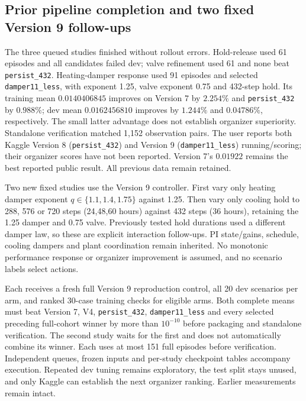 


\subsection{Prior pipeline completion and two fixed Version 9 follow-ups}
The three queued studies finished without rollout errors. Hold-release used
61 episodes and all candidates failed dev; valve refinement used 61 and none
beat \texttt{persist\_432}. Heating-damper response used 91 episodes and
selected \texttt{damper11\_less}, with exponent 1.25, valve exponent 0.75 and
432-step hold. Its training mean $0.0140406845$ improves on Version 7 by
$2.254\%$ and \texttt{persist\_432} by $0.988\%$; dev mean $0.0162456810$
improves by $1.244\%$ and $0.04786\%$, respectively. The small latter
advantage does not establish organizer superiority. Standalone verification
matched 1,152 observation pairs. The user reports both Kaggle Version 8
(\texttt{persist\_432}) and Version 9 (\texttt{damper11\_less}) running/scoring;
their organizer scores have not been reported. Version 7's $0.01922$ remains
the best reported public result. All previous data remain retained.

Two new fixed studies use the Version 9 controller. First vary only heating
damper exponent $q\in\{1.1,1.4,1.75\}$ against 1.25. Then vary only cooling
hold to 288, 576 or 720 steps (24,48,60 hours) against 432 steps (36 hours),
retaining the 1.25 damper and 0.75 valve. Previously tested hold durations
used a different damper law, so these are explicit interaction follow-ups.
PI state/gains, schedule, cooling dampers and plant coordination remain
inherited. No monotonic performance response or organizer improvement is
assumed, and no scenario labels select actions.

Each receives a fresh full Version 9 reproduction control, all 20 dev
scenarios per arm, and ranked 30-case training checks for eligible arms.
Both complete means must beat Version 7, V4, \texttt{persist\_432},
\texttt{damper11\_less} and every selected preceding full-cohort winner by
more than $10^{-10}$ before packaging and standalone verification. The second
study waits for the first and does not automatically combine its winner.
Each uses at most 151 full episodes before verification. Independent queues,
frozen inputs and per-study checkpoint tables accompany execution. Repeated
dev tuning remains exploratory, the test split stays unused, and only Kaggle
can establish the next organizer ranking. Earlier measurements remain intact.



